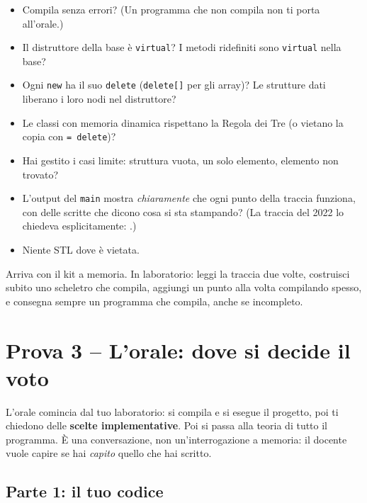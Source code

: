 \begin{consiglio}
\begin{itemize}
  \item Compila senza errori? (Un programma che non compila non ti porta all'orale.)
  \item Il distruttore della base è \texttt{virtual}? I metodi ridefiniti sono
        \texttt{virtual} nella base?
  \item Ogni \texttt{new} ha il suo \texttt{delete} (\texttt{delete[]} per gli array)?
        Le strutture dati liberano i loro nodi nel distruttore?
  \item Le classi con memoria dinamica rispettano la Regola dei Tre (o vietano la copia
        con \texttt{= delete})?
  \item Hai gestito i casi limite: struttura vuota, un solo elemento, elemento non
        trovato?
  \item L'output del \texttt{main} mostra \emph{chiaramente} che ogni punto della traccia
        funziona, con delle scritte che dicono cosa si sta stampando? (La traccia del
        2022 lo chiedeva esplicitamente: .)
  \item Niente STL dove è vietata.
\end{itemize}
\end{consiglio}

\begin{inparole}
Arriva con il kit a memoria. In laboratorio: leggi la traccia due volte, costruisci
subito uno scheletro che compila, aggiungi un punto alla volta compilando spesso, e
consegna sempre un programma che compila, anche se incompleto.
\end{inparole}

\section{Prova 3 -- L'orale: dove si decide il voto}

L'orale comincia dal tuo laboratorio: si compila e si esegue il progetto, poi ti
chiedono delle \textbf{scelte implementative}. Poi si passa alla teoria di tutto il
programma. È una conversazione, non un'interrogazione a memoria: il docente vuole capire
se hai \emph{capito} quello che hai scritto.

\subsection*{Parte 1: il tuo codice}

